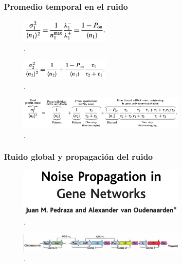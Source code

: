\documentclass{beamer}
\begin{document}
\begin{frame}
\frametitle{Promedio temporal en el ruido}

\begin{figure}[p]
    \centering
    \includegraphics[width=0.4\textwidth]{5d.png}\\
    \tiny \cite{paulsson05}.
\end{figure}

\begin{figure}[p]
    \centering
    \includegraphics[width=0.4\textwidth]{5r.png}\\
    \tiny \cite{paulsson05}.
\end{figure}

\begin{figure}[p]
    \centering
    \includegraphics[width=0.75\textwidth]{eqtave.png}\\
    \tiny \cite{paulsson05}.
\end{figure}
\end{frame}
\fi

\begin{frame}
  \frametitle{Ruido global y propagaci\'on del ruido}
\begin{figure}[p]
    \centering
    \includegraphics[width=0.75\textwidth]{pedraza05.png}\\
    \tiny \cite{pedraza05}.
\end{figure}
\begin{figure}[p]
    \centering
    \includegraphics[width=0.75\textwidth]{circuitex.png}\\
    \tiny \cite{pedraza05}.
\end{figure}
\end{frame}
\end{document}
